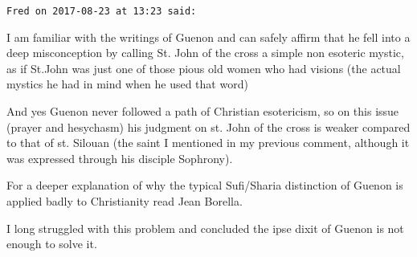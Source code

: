 \begin{footnotesize}
\begin{sffamily}
\hfill

\texttt{Fred on 2017-08-23 at 13:23 said: }

I am familiar with the writings of Guenon and can safely affirm that he fell into a deep misconception by calling St. John of the cross a simple non esoteric mystic, as if St.John was just one of those pious old women who had visions (the actual mystics he had in mind when he used that word)

And yes Guenon never followed a path of Christian esotericism, so on this issue (prayer and hesychasm) his judgment on st. John of the cross is weaker compared to that of st. Silouan (the saint I mentioned in my previous comment, although it was expressed through his disciple Sophrony). 

For a deeper explanation of why the typical Sufi/Sharia distinction of Guenon is applied badly to Christianity read Jean Borella.

I long struggled with this problem and concluded the ipse dixit of Guenon is not enough to solve it.


\hfill


\end{sffamily}\end{footnotesize}
